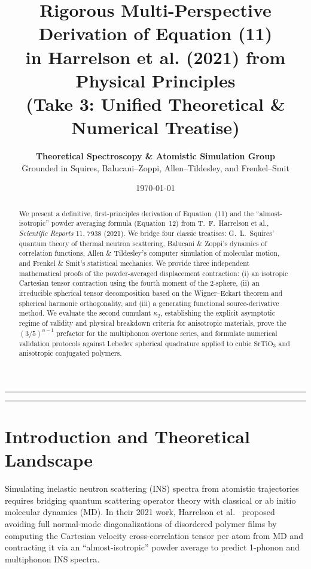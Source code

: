 \documentclass[11pt,a4paper]{article}
\title{\textbf{Rigorous Multi-Perspective Derivation of Equation (11) \\ in Harrelson et al. (2021) from Physical Principles \\ \Large (Take 3: Unified Theoretical \& Numerical Treatise)}}
\author{
    \textbf{Theoretical Spectroscopy \& Atomistic Simulation Group} \\
    \small Grounded in Squires, Balucani--Zoppi, Allen--Tildesley, and Frenkel--Smit
}
\date{\today}
\theoremstyle{definition}
\begin{document}
\maketitle

\begin{abstract}
We present a definitive, first-principles derivation of Equation~(11) and the ``almost-isotropic'' powder averaging formula (Equation~12) from T.~F.~Harrelson et al., \emph{Scientific Reports} 11, 7938 (2021). We bridge four classic treatises: G.~L.~Squires' quantum theory of thermal neutron scattering, Balucani \& Zoppi's dynamics of correlation functions, Allen \& Tildesley's computer simulation of molecular motion, and Frenkel \& Smit's statistical mechanics. We provide three independent mathematical proofs of the powder-averaged displacement contraction: (i) an isotropic Cartesian tensor contraction using the fourth moment of the 2-sphere, (ii) an irreducible spherical tensor decomposition based on the Wigner--Eckart theorem and spherical harmonic orthogonality, and (iii) a generating functional source-derivative method. We evaluate the second cumulant $\kappa_2$, establishing the explicit asymptotic regime of validity and physical breakdown criteria for anisotropic materials, prove the $(3/5)^{n-1}$ prefactor for the multiphonon overtone series, and formulate numerical validation protocols against Lebedev spherical quadrature applied to cubic $\text{SrTiO}_3$ and anisotropic conjugated polymers.
\end{abstract}

\vspace{0.5em}
\hrule
\vspace{1.2em}

\tableofcontents

\vspace{1.5em}
\hrule
\vspace{1.5em}

\section{Introduction and Theoretical Landscape}

Simulating inelastic neutron scattering (INS) spectra from atomistic trajectories requires bridging quantum scattering operator theory with classical or ab initio molecular dynamics (MD). In their 2021 work, Harrelson et al.~\cite{harrelson2021} proposed avoiding full normal-mode diagonalizations of disordered polymer films by computing the Cartesian velocity cross-correlation tensor per atom from MD and contracting it via an ``almost-isotropic'' powder average to predict 1-phonon and multiphonon INS spectra.
\end{document}
